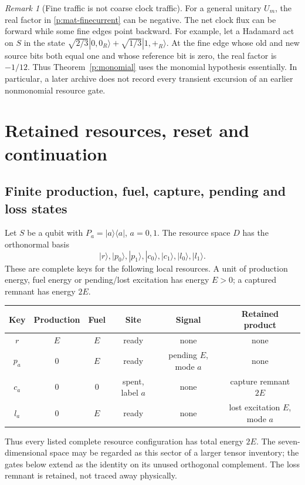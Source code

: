 \documentclass[11pt,oneside,openany]{book}
\theoremstyle{definition}
\theoremstyle{remark}\newtheorem{remark}[theorem]{Remark}
\begin{document}
\begin{remark}[Fine traffic is not coarse clock traffic]
\label{p:mat-finewarning}
For a general unitary $U_m$, the real factor in
\eqref{p:mat-finecurrent} can be negative.  The net clock flux can be
forward while some fine edges point backward.  For example, let a
Hadamard act on $S$ in the state
$\sqrt{2/3}|0,0_R\rangle+\sqrt{1/3}|1,+_R\rangle$.  At the fine edge
whose old and new source bits both equal one and whose reference bit
is zero, the real factor is $-1/12$.  Thus
Theorem~\ref{p:monomial} uses the monomial hypothesis essentially.
In particular, a later archive does not record every transient
excursion of an earlier nonmonomial resource gate.
\end{remark}

\section{Retained resources, reset and continuation}
\label{p:mat-resources}

\subsection{Finite production, fuel, capture, pending and loss states}

Let $S$ be a qubit with $P_a=|a\rangle\langle a|$, $a=0,1$.
The resource space $D$ has the orthonormal basis
\[
 |r\rangle,|p_0\rangle,|p_1\rangle,
 |c_0\rangle,|c_1\rangle,|l_0\rangle,|l_1\rangle.
\]
These are complete keys for the following local resources.  A unit of
production energy, fuel energy or pending/lost excitation has energy
$E>0$; a captured remnant has energy $2E$.
\begin{center}
\begin{tabular}{c|c c c c c}
Key & Production & Fuel & Site & Signal & Retained product\\\hline
$r$ & $E$ & $E$ & ready & none & none\\
$p_a$ & $0$ & $E$ & ready & pending $E$, mode $a$ & none\\
$c_a$ & $0$ & $0$ & spent, label $a$ & none & capture remnant $2E$\\
$l_a$ & $0$ & $E$ & ready & none & lost excitation $E$, mode $a$
\end{tabular}
\end{center}
Thus every listed complete resource configuration has total energy
$2E$.  The seven-dimensional space may be regarded as this sector of a
larger tensor inventory; the gates below extend as the identity on
its unused orthogonal complement.  The loss remnant is retained, not
traced away physically.
\end{document}

